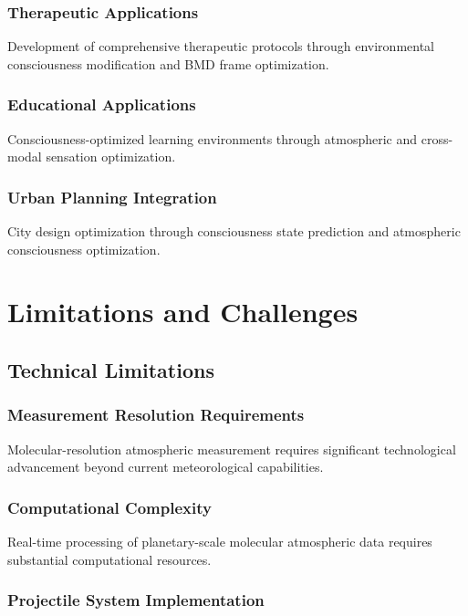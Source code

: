 \documentclass[12pt,a4paper]{article}
\begin{document}
\subsubsection{Therapeutic Applications}

Development of comprehensive therapeutic protocols through environmental consciousness modification and BMD frame optimization.

\subsubsection{Educational Applications}

Consciousness-optimized learning environments through atmospheric and cross-modal sensation optimization.

\subsubsection{Urban Planning Integration}

City design optimization through consciousness state prediction and atmospheric consciousness optimization.

\section{Limitations and Challenges}

\subsection{Technical Limitations}

\subsubsection{Measurement Resolution Requirements}

Molecular-resolution atmospheric measurement requires significant technological advancement beyond current meteorological capabilities.

\subsubsection{Computational Complexity}

Real-time processing of planetary-scale molecular atmospheric data requires substantial computational resources.

\subsubsection{Projectile System Implementation}
\end{document}
